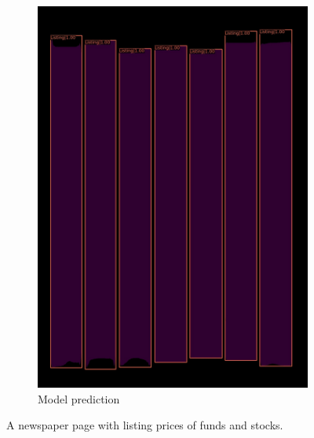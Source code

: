 \documentclass[aspectratio=1610]{beamer}
\begin{document}
\begin{frame}
\begin{figure}
\begin{subfigure}{.25\textwidth}
  \includegraphics[width=0.99\linewidth, clip=true, trim = 0mm 0mm 0mm 0mm]{figures/labels-vanilla-0.75/zk6UnuL.jpg}
  \caption{Model prediction}
\end{subfigure}
\caption{A newspaper page with listing prices of funds and stocks.}
\label{fig:stocks}
\end{figure}
\end{frame}
\normalpage
\end{document}
